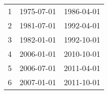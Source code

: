 % 
\begin{tabular}{ccc}
  \hline
  \hline
1 & 1975-07-01 & 1986-04-01 \\ 
  2 & 1981-07-01 & 1992-04-01 \\ 
  3 & 1982-01-01 & 1992-10-01 \\ 
  4 & 2006-01-01 & 2010-10-01 \\ 
  5 & 2006-07-01 & 2011-04-01 \\ 
  6 & 2007-01-01 & 2011-10-01 \\ 
   \hline
\end{tabular}
